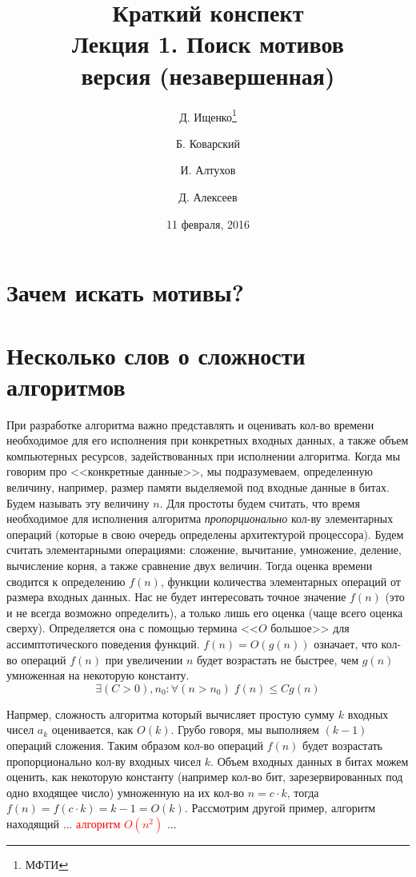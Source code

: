 \documentclass[letterpaper, 11pt]{article}
\title{\large{Краткий конспект}\\
\LARGE{Лекция 1. Поиск мотивов}\\
\normalsize версия \versionnumber (\textcolor{NavyBlue}{незавершенная})}
\date{11 февраля, 2016}
\author{Д. Ищенко\thanks{МФТИ} \and Б. Коварский\footnotemark[1]
\and И. Алтухов\footnotemark[1] \and Д. Алексеев\footnotemark[1]}
\begin{document}
\maketitle
\thispagestyle{empty}
\clearpage

\section{Зачем искать мотивы?}
\section{Несколько слов о сложности алгоритмов}
\par
При разработке алгоритма важно представлять и оценивать кол-во времени 
необходимое для его исполнения при конкретных входных данных, а также объем компьютерных ресурсов,
задействованных при исполнении алгоритма. Когда мы говорим про <<конкретные данные>>, мы подразумеваем, 
определенную величину, например, размер памяти выделяемой под входные данные в битах. Будем называть эту
величину $n$. Для простоты будем считать, что время необходимое для исполнения алгоритма \textit{пропорционально}
кол-ву элементарных операций (которые в свою очередь определены архитектурой процессора). Будем считать
элементарными операциями: сложение, вычитание, умножение, деление, вычисление корня, а также сравнение двух величин. Тогда оценка 
времени сводится к определению $f(n)$, функции количества элементарных операций от размера входных данных. Нас не будет 
интересовать точное значение $f(n)$ (это и не всегда возможно определить), а только лишь его оценка (чаще всего оценка сверху). Определяется она с помощью термина <<$O$ большое>> для ассимптотического поведения функций.
$f(n) = O(g(n))$ означает, что кол-во операций $f(n)$ при увеличении $n$ будет возрастать не быстрее, чем $g(n)$ умноженная на некоторую константу.
\[
\exists (C > 0), n_0 : \forall (n > n_0) \; f(n) \leq Cg(n)
\]
\par
Напрмер, сложность алгоритма который вычисляет простую сумму $k$ входных чисел $a_k$ оценивается, как $O(k)$. Грубо говоря, мы выполняем $(k-1)$ операций сложения. Таким образом кол-во операций $f(n)$ будет возрастать пропорционально кол-ву входных чисел $k$. Объем входных данных в битах можем оценить, как некоторую константу (например кол-во бит, зарезервированных под одно входящее число) умноженную на их кол-во $n = c \cdot k$, тогда $f(n) = f(c \cdot k) = k - 1 = O(k)$. Рассмотрим другой пример, алгоритм находящий ... \textcolor{red}{алгоритм $O(n^2)$} ...
\par
\end{document}
